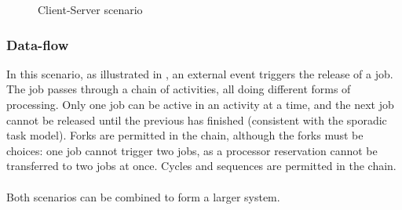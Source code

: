 \begin{figure}
    \centering
      \caption{Client-Server scenario}
      \label{fig:client-server}
\end{figure}

  \subsubsection{Data-flow}

In this scenario, as illustrated in , an external event triggers the release of a job.
The job passes through a chain of activities, all doing different forms of processing.
Only one job can be active in an activity at a time, and the next job cannot be released until the previous has finished (consistent with the sporadic task model).
Forks are permitted in the chain, although the forks must be choices: one job cannot trigger two jobs, as a processor reservation cannot be transferred to two jobs at once.
Cycles and sequences are permitted in the chain.
\\
\\
Both scenarios can be combined to form a larger system.


